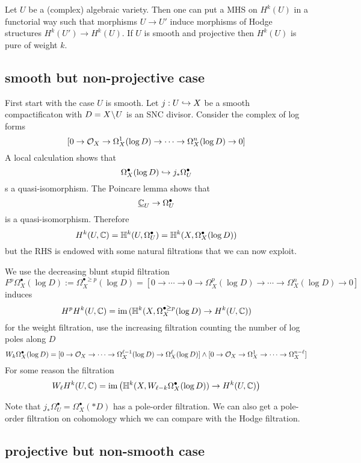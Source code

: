 \documentclass[12pt]{article}
\newcommand{\HH}{\mathbb{H}}
\begin{document}
\begin{theorem}[Deligne '71, '74]
Let $U$ be a (complex) algebraic variety. Then one can put a MHS on $H^k(U)$ in a functorial way such that morphisms $U \to U'$ induce morphisms of Hodge structures $H^k(U') \to H^k(U)$. If $U$ is smooth and projective then $H^k(U)$ is pure of weight $k$.
\end{theorem}


\subsection{smooth but non-projective case}

First start with the case $U$ is smooth. Let $j : U \hookrightarrow X$ be a smooth compactificaton with $D = X \! \setminus \! U$ is an SNC divisor. Consider the complex of log forms 
\[ [ 0 \to \mathcal{O}_{X} \to \Omega_X^1(\log{D}) \to \cdots \to \Omega_X^n(\log{D}) \to 0] \]
A local calculation shows that
\[ \Omega_X^\bullet(\log{D}) \hookrightarrow j_* \Omega^\bullet_U \]
s a quasi-isomorphism. The Poincare lemma shows that
\[ \underline{\mathbb{C}}_U \to \Omega_U^\bullet \]
is a quasi-isomorphism. Therefore
\[ H^k(U, \CC) = \HH^k(U, \Omega_U^\bullet) = \HH^k(X, \Omega_X^\bullet(\log{D})) \]
but the RHS is endowed with some natural filtrations that we can now exploit. 


We use the decreasing blunt stupid filtration
\[ F^p \Omega_X^\bullet(\log{D}) := \Omega_X^{\bullet \ge p}(\log{D}) = [0 \to \cdots \to 0 \to \Omega_X^p(\log{D}) \to \cdots \to \Omega_X^n(\log{D}) \to 0] \]
induces
\[ H^p H^k(U, \CC) = \im{(\HH^k(X, \Omega_X^{\bullet \ge p}(\log{D}) \to H^k(U, \CC))} \] 
for the weight filtration, use the increasing filtration counting the number of log poles along $D$
\[ W_k \Omega_X^\bullet(\log{D}) = [0 \to \mathcal{O}_{X} \to \cdots \to \Omega_X^{\ell-1}(\log{D}) \to \Omega_X^{\ell}(\log{D})] \wedge [0 \to \mathcal{O}_{X} \to \Omega_X^1 \to \cdots \to \Omega_X^{n - \ell}] \]
For some reason the filtration
\[ W_{\ell} H^k(U, \CC) = \im{ \left( \HH^k(X, W_{\ell - k} \Omega_X^\bullet(\log{D})) \to H^k(U, \CC) \right) } \]

\begin{rmk}
Note that $j_* \Omega_U^\bullet = \Omega_X^\bullet(*D)$ has a pole-order filtration. We can also get a pole-order filtration on cohomology which we can compare with the Hodge filtration. 
\end{rmk}

\subsection{projective but non-smooth case}
\end{document}
